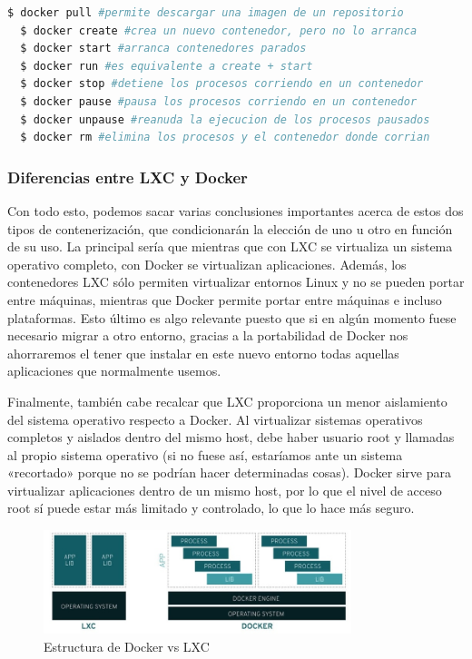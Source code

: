 \begin{lstlisting}[language=bash]
  $ docker pull #permite descargar una imagen de un repositorio
  $ docker create #crea un nuevo contenedor, pero no lo arranca 
  $ docker start #arranca contenedores parados
  $ docker run #es equivalente a create + start
  $ docker stop #detiene los procesos corriendo en un contenedor  
  $ docker pause #pausa los procesos corriendo en un contenedor
  $ docker unpause #reanuda la ejecucion de los procesos pausados
  $ docker rm #elimina los procesos y el contenedor donde corrian
\end{lstlisting}

\subsubsection{Diferencias entre LXC y Docker}
	Con todo esto, podemos sacar varias conclusiones importantes acerca de estos dos tipos de contenerización, que condicionarán la elección de uno u otro en función de su uso. La principal sería que mientras que con LXC se virtualiza un sistema operativo completo, con Docker se virtualizan aplicaciones. Además, los contenedores LXC sólo permiten virtualizar entornos Linux y no se pueden portar entre máquinas, mientras que Docker permite portar entre máquinas e incluso plataformas. Esto último es algo relevante puesto que si en algún momento fuese necesario migrar a otro entorno, gracias a la portabilidad de Docker nos ahorraremos el tener que instalar en este nuevo entorno todas aquellas aplicaciones que normalmente usemos. 

	Finalmente, también cabe recalcar que LXC proporciona un menor aislamiento del sistema operativo respecto a Docker. Al virtualizar sistemas operativos completos y aislados dentro del mismo host, debe haber usuario root y llamadas al propio sistema operativo (si no fuese así, estaríamos ante un sistema «recortado» porque no se podrían hacer determinadas cosas). Docker sirve para virtualizar aplicaciones dentro de un mismo host, por lo que el nivel de acceso root sí puede estar más limitado y controlado, lo que lo hace más seguro.

	\vspace{0.2cm}
	\begin{figure}[h]
	\centering
	\includegraphics[width=0.8\textwidth]{../imgs/EdA/LXCvsDocker.jpg}
	\caption{Estructura de Docker vs LXC}
	\label{fig:docker-life}
	\end{figure}
	\clearpage

